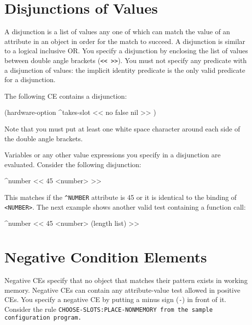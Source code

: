 \section{Disjunctions of Values}

  A disjunction is a list of values any one of which can
  match the value of an attribute in an object in order
  for the match to succeed. A disjunction is similar to a
  logical inclusive OR. You specify a disjunction by
  enclosing the list of values between double angle
  brackets (\verb|<< >>|). You must not specify any predicate
  with a disjunction of values: the implicit identity
  predicate is the only valid predicate for a disjunction.

  The following CE contains a disjunction:
\begin{qv}
(hardware-option ^takes-slot << no false nil >> )
\end{qv}

  Note that you must put at least one white space
  character around each side of the double angle brackets.

  Variables or any other value expressions you specify in
  a disjunction are evaluated. Consider the following
  disjunction:
\begin{qv}
^number << 45 <number> >>
\end{qv}

  This matches if the \verb|^NUMBER| attribute is 45 or it is
  identical to the binding of \verb|<NUMBER>|. The next example
  shows another valid test containing a function call:
\begin{qv}
^number << 45 <number> (length list) >>
\end{qv}

\section{Negative Condition Elements}

Negative CEs specify that no object that matches their pattern exists
in working memory. Negative CEs can contain any attribute-value test
allowed in positive CEs. You specify a negative CE by putting a minus
sign (\verb|-|) in front of it. Consider the rule
\tt{CHOOSE-SLOTS:PLACE-NONMEMORY} from the sample configuration
program.

